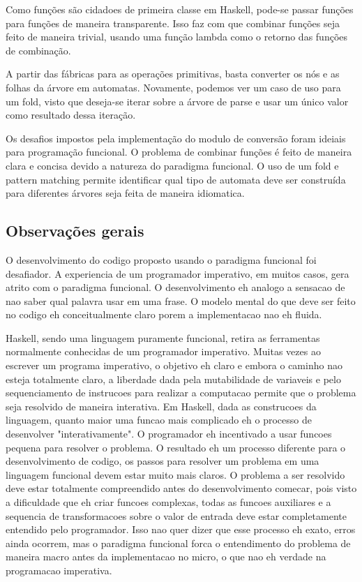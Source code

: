 Como funções são cidadoes de primeira classe em Haskell, pode-se passar funções para funções de maneira transparente.
Isso faz com que combinar funções seja feito de maneira trivial, usando uma função lambda como o retorno das funções de combinação.

A partir das fábricas para as operações primitivas, basta converter os nós e as folhas da árvore em automatas.
Novamente, podemos ver um caso de uso para um fold, visto que deseja-se iterar sobre a árvore de parse e usar um único valor como resultado dessa iteração.

Os desafios impostos pela implementação do modulo de conversão foram ideiais para programação funcional.
O problema de combinar funções é feito de maneira clara e concisa devido a natureza do paradigma funcional.
O uso de um fold e pattern matching permite identificar qual tipo de automata deve ser construída para diferentes árvores seja feita de maneira idiomatica.

\subsection{Observações gerais}

O desenvolvimento do codigo proposto usando o paradigma funcional foi desafiador.
A experiencia de um programador imperativo, em muitos casos, gera atrito com o paradigma funcional.
O desenvolvimento eh analogo a sensacao de nao saber qual palavra usar em uma frase.
O modelo mental do que deve ser feito no codigo eh conceitualmente claro porem a implementacao nao eh fluida.

Haskell, sendo uma linguagem puramente funcional, retira as ferramentas normalmente conhecidas de um programador imperativo.
Muitas vezes ao escrever um programa imperativo, o objetivo eh claro e embora o caminho nao esteja totalmente claro, a liberdade dada pela mutabilidade de variaveis e pelo sequenciamento de instrucoes para realizar a computacao permite que o problema seja resolvido de maneira interativa.
Em Haskell, dada as construcoes da linguagem, quanto maior uma funcao mais complicado eh o processo de desenvolver "interativamente".
O programador eh incentivado a usar funcoes pequena para resolver o problema.
O resultado eh um processo diferente para o desenvolvimento de codigo, os passos para resolver um problema em uma linguagem funcional devem estar muito mais claros.
O problema a ser resolvido deve estar totalmente compreendido antes do desenvolvimento comecar, pois visto a dificuldade que eh criar funcoes complexas, todas as funcoes auxiliares e a sequencia de transformacoes sobre o valor de entrada deve estar completamente entendido pelo programador.
Isso nao quer dizer que esse processo eh exato, erros ainda ocorrem, mas o paradigma funcional forca o entendimento do problema de maneira macro antes da implementacao no micro, o que nao eh verdade na programacao imperativa.

